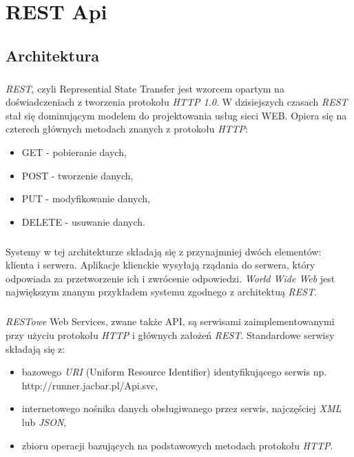 \chapter{REST Api} %
\label{cha:rest_api}
\section{Architektura} %
\label{sec:architektura}
\paragraph{} %
\label{par:}
\textit{REST}, czyli Represential State Transfer jest wzorcem opartym na doświadczeniach z tworzenia protokołu \textit{HTTP 1.0}. W dzisiejszych czasach \textit{REST} stał się dominującym modelem do projektowania usług sieci WEB. Opiera się na czterech głównych metodach znanych z protokołu \textit{HTTP}: 

\begin{itemize}
	\item GET - pobieranie daych,
	\item POST - tworzenie danych,
	\item PUT - modyfikowanie danych,
	\item DELETE - usuwanie danych.
\end{itemize}

\paragraph{} %
\label{par:}
Systemy w tej architekturze składają się z przynajmniej dwóch elementów: klienta i serwera. Aplikacje klienckie wysyłają rządania do serwera, który odpowiada za przetworzenie ich i zwrócenie odpowiedzi.
\textit{World Wide Web} jest największym znanym przykładem systemu zgodnego z architektuą \textit{REST}.

\paragraph{} %
\label{par:}
\textit{RESTowe} Web Services, zwane także API, są serwisami zaimplementowanymi przy użyciu protokołu \textit{HTTP} i głównych założeń \textit{REST}. Standardowe serwisy składają się z:
\begin{itemize}
	\item bazowego \textit{URI} (Uniform Resource Identifier) identyfikującego serwis np. http://runner.jacbar.pl/Api.svc,
	\item internetowego nośnika danych obsługiwanego przez serwis, najczęściej \textit{XML} lub \textit{JSON},
	\item zbioru operacji bazujących na podstawowych metodach protokołu \textit{HTTP}.
\end{itemize}

